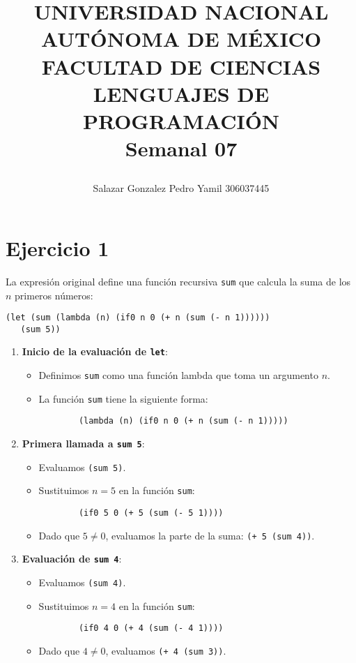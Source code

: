 \documentclass{article}
\title{
	\vspace{-0.7in} 	
	\usefont{OT1}{bch}{b}{n}
	\begin{minipage}{3cm}
    \vspace{-0.5in} 	
	\begin{center}
	\end{center}
    \end{minipage}\hfill
    \begin{minipage}{10.7cm}
    \begin{center}
    \normalfont \normalsize \textsc{UNIVERSIDAD NACIONAL AUTÓNOMA DE MÉXICO \\ FACULTAD DE CIENCIAS \\ LENGUAJES DE PROGRAMACIÓN} \\
		\huge Semanal 07
    \end{center}
    \end{minipage}\hfill
    \begin{minipage}{3.2cm}
    \vspace{-0.5in} 
	\begin{center}
	\end{center}
    \end{minipage}
}
\author{Salazar Gonzalez Pedro Yamil 306037445}
\date{}
\begin{document}
\maketitle

\section{Ejercicio 1 }
La expresión original define una función recursiva \texttt{sum} que calcula la suma de los \( n \) primeros números:

\begin{lstlisting}
(let (sum (lambda (n) (if0 n 0 (+ n (sum (- n 1)))))) 
   (sum 5))
\end{lstlisting}

\begin{enumerate}
    \item \textbf{Inicio de la evaluación de \texttt{let}}:
    \begin{itemize}
        \item Definimos \texttt{sum} como una función lambda que toma un argumento \(n\).
        \item La función \texttt{sum} tiene la siguiente forma:
        \begin{lstlisting}
        (lambda (n) (if0 n 0 (+ n (sum (- n 1)))))
        \end{lstlisting}
    \end{itemize}
    
    \item \textbf{Primera llamada a \texttt{sum 5}}:
    \begin{itemize}
        \item Evaluamos \texttt{(sum 5)}.
        \item Sustituimos \(n = 5\) en la función \texttt{sum}:
        \begin{lstlisting}
        (if0 5 0 (+ 5 (sum (- 5 1))))
        \end{lstlisting}
        \item Dado que \(5 \neq 0\), evaluamos la parte de la suma: \texttt{(+ 5 (sum 4))}.
    \end{itemize}
    
    \item \textbf{Evaluación de \texttt{sum 4}}:
    \begin{itemize}
        \item Evaluamos \texttt{(sum 4)}.
        \item Sustituimos \(n = 4\) en la función \texttt{sum}:
        \begin{lstlisting}
        (if0 4 0 (+ 4 (sum (- 4 1))))
        \end{lstlisting}
        \item Dado que \(4 \neq 0\), evaluamos \texttt{(+ 4 (sum 3))}.
    \end{itemize}
    

\end{enumerate}
\end{document}
